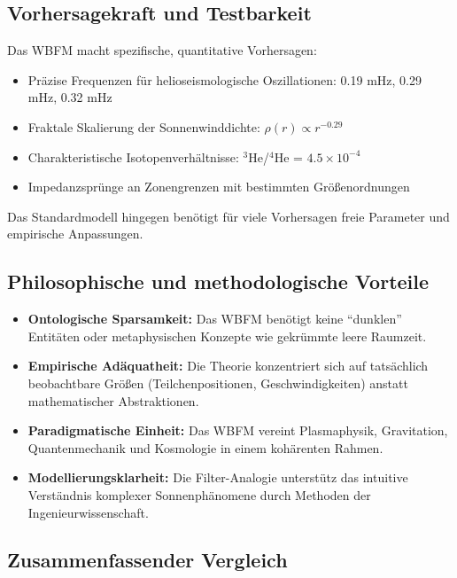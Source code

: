 \subsection{Vorhersagekraft und Testbarkeit}

Das WBFM macht spezifische, quantitative Vorhersagen:

\begin{itemize}
\item Präzise Frequenzen für helioseismologische Oszillationen: 0.19 mHz, 0.29 mHz, 0.32 mHz
\item Fraktale Skalierung der Sonnenwinddichte: $\rho(r) \propto r^{-0.29}$
\item Charakteristische Isotopenverhältnisse: $^3$He/$^4$He = $4.5 \times 10^{-4}$
\item Impedanzsprünge an Zonengrenzen mit bestimmten Größenordnungen
\end{itemize}

Das Standardmodell hingegen benötigt für viele Vorhersagen freie Parameter und empirische Anpassungen.

\subsection{Philosophische und methodologische Vorteile}

\begin{itemize}
\item \textbf{Ontologische Sparsamkeit:} Das WBFM benötigt keine \enquote{dunklen} Entitäten oder metaphysischen Konzepte wie gekrümmte leere Raumzeit.
\item \textbf{Empirische Adäquatheit:} Die Theorie konzentriert sich auf tatsächlich beobachtbare Größen (Teilchenpositionen, Geschwindigkeiten) anstatt mathematischer Abstraktionen.
\item \textbf{Paradigmatische Einheit:} Das WBFM vereint Plasmaphysik, Gravitation, Quantenmechanik und Kosmologie in einem kohärenten Rahmen.
\item \textbf{Modellierungsklarheit:} Die Filter-Analogie unterstütz das intuitive Verständnis komplexer Sonnenphänomene durch Methoden der Ingenieurwissenschaft.
\end{itemize}

\subsection{Zusammenfassender Vergleich}

